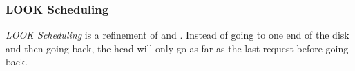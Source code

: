 \subsubsection{LOOK Scheduling}\label{subsubsec:LOOK_Disk_Scheduling}
\emph{LOOK Scheduling} is a refinement of  and .
Instead of going to one end of the disk and then going back, the head will only go as far as the last request before going back.

